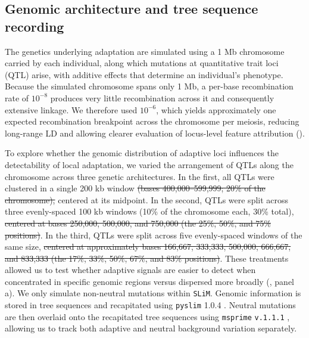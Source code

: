 \documentclass[]{article}
\newcommand{\slim}{\texttt{SLiM}\xspace}
\begin{document}
\subsection{Genomic architecture and tree sequence recording}
The genetics underlying adaptation are simulated using a 1 Mb chromosome 
carried by each individual, 
along which mutations at quantitative trait loci (QTL) 
arise, with additive effects that determine an individual's phenotype.
Because the simulated chromosome spans only 1 Mb,
a per-base recombination rate of \(10^{-8}\)
produces very little recombination across it
and consequently extensive linkage.
We therefore used \(10^{-6}\),
which yields approximately one expected recombination breakpoint
across the chromosome per meiosis,
reducing long-range LD and allowing clearer evaluation of locus-level
feature attribution ().

To explore whether the genomic distribution of adaptive loci
influences the detectability of local adaptation,
we varied the arrangement of QTLs along the chromosome
across three genetic architectures. In the first,
all QTLs were clustered in a single 200 kb window
\sout{(bases 400,000--599,999; 20\% of the chromosome),} centered at its midpoint.
In the second,
QTLs were split across three evenly-spaced 100 kb windows (10\% of the chromosome each, 30\% total),
\sout{centered at bases 250,000, 500,000, and 750,000
(the 25\%, 50\%, and 75\% positions)}.
In the third, QTLs were split across five evenly-spaced windows of the same size, %
\sout{centered at approximately bases 166,667, 333,333, 500,000, 666,667, and 833,333
(the 17\%, 33\%, 50\%, 67\%, and 83\% positions)}.
These treatments allowed us to test whether adaptive 
signals are easier to detect when concentrated in 
specific genomic regions versus dispersed more broadly 
(, panel a).
We only simulate non-neutral mutations within \slim.
Genomic information is stored in tree sequences
and recapitated using \texttt{pyslim} 1.0.4 \citep{haller2019treeseq}.
Neutral mutations are then overlaid onto the recapitated tree sequences
using \texttt{msprime} \texttt{v.1.1.1} \citep{baumdicker2022efficient},
allowing us to track both adaptive
and neutral background variation separately.
\end{document}
